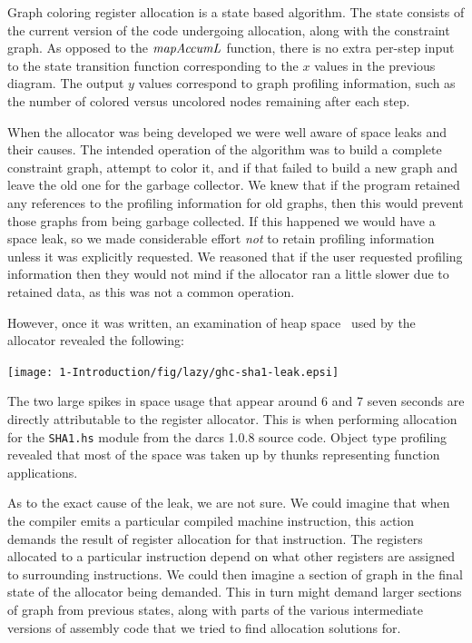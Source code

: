 Graph coloring register allocation is a state based algorithm. The state consists of the current version of the code undergoing allocation, along with the constraint graph. As opposed to the $\operatorname{\mathit{mapAccumL}}$ function, there is no extra per-step input to the state transition function corresponding to the $x$ values in the previous diagram. The output $y$ values correspond to graph profiling information, such as the number of colored versus uncolored nodes remaining after each step.

When the allocator was being developed we were well aware of space leaks and their causes. The intended operation of the algorithm was to build a complete constraint graph, attempt to color it, and if that failed to build a new graph and leave the old one for the garbage collector. We knew that if the program retained any references to the profiling information for old graphs, then this would prevent those graphs from being garbage collected. If this happened we would have a space leak, so we made considerable effort \emph{not} to retain profiling information unless it was explicitly requested. We reasoned that if the user requested profiling information then they would not mind if the allocator ran a little slower due to retained data, as this was not a common operation.

 However, once it was written, an examination of heap space~\cite{sansom:profiling} used by the allocator revealed the following:

\begin{center}
\texttt{[image: 1-Introduction/fig/lazy/ghc-sha1-leak.epsi]}
\end{center}

The two large spikes in space usage that appear around 6 and 7 seven seconds are directly attributable to the register allocator. This is when performing allocation for the \texttt{SHA1.hs} module from the darcs 1.0.8 source code. Object type profiling revealed that most of the space was taken up by thunks representing function applications.

As to the exact cause of the leak, we are not sure. We could imagine that when the compiler emits a particular compiled machine instruction, this action demands the result of register allocation for that instruction. The registers allocated to a particular instruction depend on what other registers are assigned to surrounding instructions. We could then imagine a section of graph in the final state of the allocator being demanded. This in turn might demand larger sections of graph from previous states, along with parts of the various intermediate versions of assembly code that we tried to find allocation solutions for. 

